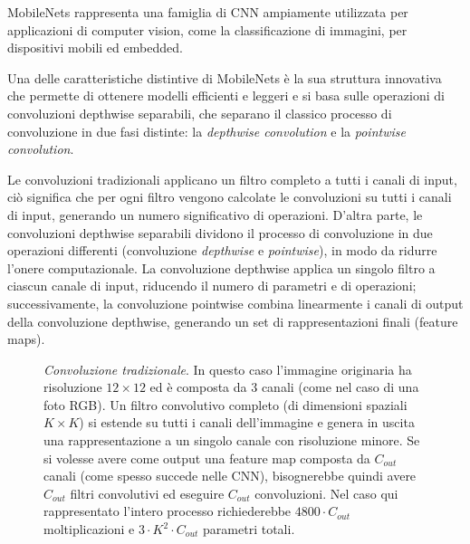 MobileNets \cite{MobileNets} rappresenta una famiglia di CNN ampiamente utilizzata per applicazioni di computer vision, come la classificazione di immagini, per dispositivi mobili ed embedded. 

Una delle caratteristiche distintive di MobileNets è la sua struttura innovativa che permette di ottenere modelli efficienti e leggeri e si basa sulle operazioni di convoluzioni depthwise separabili, che separano il classico processo di convoluzione in due fasi distinte: la \textit{depthwise convolution} e la \textit{pointwise convolution}. 

Le convoluzioni tradizionali applicano un filtro completo a tutti i canali di input, ciò significa che per ogni filtro vengono calcolate le convoluzioni su tutti i canali di input, generando un numero significativo di operazioni. D'altra parte, le convoluzioni depthwise separabili dividono il processo di convoluzione in due operazioni differenti (convoluzione \textit{depthwise} e \textit{pointwise}), in modo da ridurre l'onere computazionale. La convoluzione depthwise applica un singolo filtro a ciascun canale di input, riducendo il numero di parametri e di operazioni; successivamente, la convoluzione pointwise combina linearmente i canali di output della convoluzione depthwise, generando un set di rappresentazioni finali (feature maps).


\begin{figure}[ht!]
    \centering
    \caption{\textit{Convoluzione tradizionale}. In questo caso l'immagine originaria ha risoluzione $12\times12$ ed è composta da 3 canali (come nel caso di una foto RGB). Un filtro convolutivo completo (di dimensioni spaziali $K \times K$) si estende su tutti i canali dell'immagine e genera in uscita una rappresentazione a un singolo canale con risoluzione minore. Se si volesse avere come output una feature map composta da $C_{out}$ canali (come spesso succede nelle CNN), bisognerebbe quindi avere $C_{out}$ filtri convolutivi ed eseguire $C_{out}$ convoluzioni. Nel caso qui rappresentato l'intero processo richiederebbe $4800\cdot C_{out}$ moltiplicazioni e $3 \cdot K^{2} \cdot C_{out}$ parametri totali.}
\end{figure}


